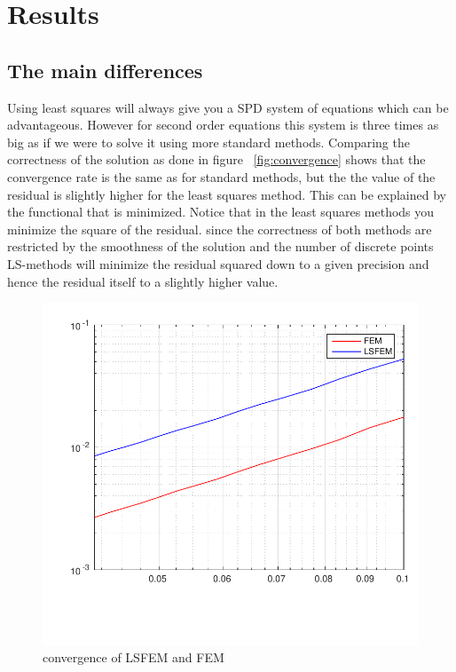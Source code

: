 
\chapter{Results} %

\label{chap:results} %


\section{The main differences}
Using least squares will always give you a SPD system of equations which can be advantageous. However for second order equations this system is three times as big as if we were to solve it using more standard methods. Comparing the correctness of the solution as done in figure ~\ref{fig:convergence} shows that the convergence rate is the same as for standard methods, but the the value of the residual is slightly higher for the least squares method. This can be explained by the functional that is minimized. Notice that in the least squares methods you minimize the square of the residual. since the correctness of both methods are restricted by the smoothness of the solution and the number of discrete points LS-methods will minimize the residual squared down to a given precision and hence the residual itself to a slightly higher value. 
%
\begin{figure}[hl]
	\centering
	\includegraphics{Figures/errorFEM-LSFEM.pdf}
	\caption{convergence of LSFEM and FEM}
	\label{fig:convergenceFEM}
\end{figure}
